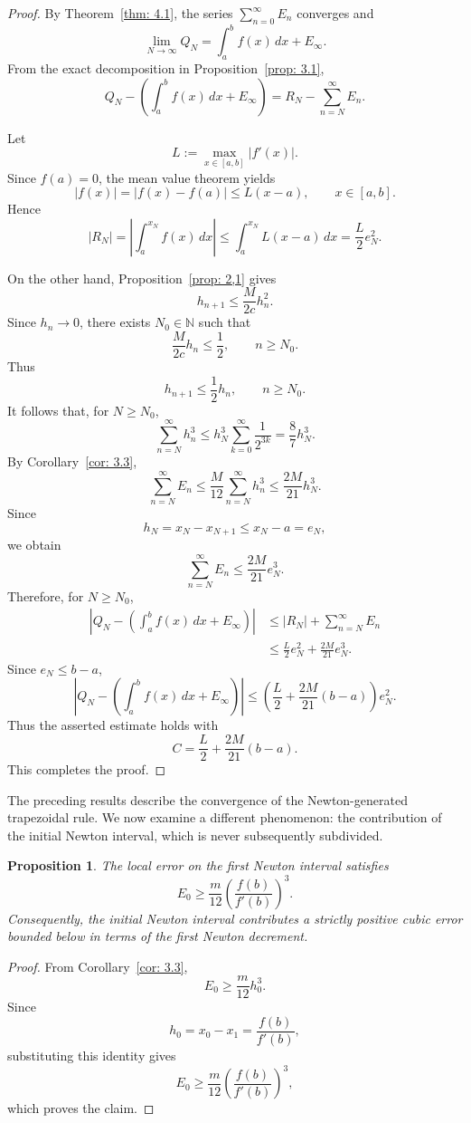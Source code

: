 \documentclass[psamsfonts,reqno]{amsart}
\theoremstyle{plain}
\newtheorem{proposition}[theorem]{Proposition}
\theoremstyle{definition}
\theoremstyle{remark}
\numberwithin{equation}{section}
\begin{document}
\begin{proof}
By Theorem~\ref{thm: 4.1},
the series $\sum_{n=0}^{\infty}E_n$ converges and
\[
\lim_{N\to\infty}Q_N
=
\int_a^b f(x)\,dx+E_\infty.
\]
From the exact decomposition in Proposition~\ref{prop: 3.1},
\[
Q_N-
\left(
\int_a^b f(x)\,dx+E_\infty
\right)
=
R_N-\sum_{n=N}^{\infty}E_n.
\]

Let
\[
L:=\max_{x\in[a,b]}|f'(x)|.
\]
Since $f(a)=0$, the mean value theorem yields
\[
|f(x)|
=
|f(x)-f(a)|
\leq L(x-a),
\qquad x\in[a,b].
\]
Hence
\[
|R_N|
=
\left|\int_a^{x_N}f(x)\,dx\right|
\leq
\int_a^{x_N}L(x-a)\,dx
=
\frac{L}{2}e_N^2.
\]

On the other hand, Proposition~\ref{prop: 2,1} gives
\[
h_{n+1}\leq \frac{M}{2c}h_n^2.
\]
Since $h_n\to0$, there exists $N_0\in\mathbb{N}$ such that
\[
\frac{M}{2c}h_n\leq\frac12,
\qquad n\geq N_0.
\]
Thus
\[
h_{n+1}\leq\frac12h_n,
\qquad n\geq N_0.
\]
It follows that, for $N\geq N_0$,
\[
\sum_{n=N}^{\infty}h_n^3
\leq
h_N^3\sum_{k=0}^{\infty}\frac{1}{2^{3k}}
=
\frac{8}{7}h_N^3.
\]
By Corollary~\ref{cor: 3.3},
\[
\sum_{n=N}^{\infty}E_n
\leq
\frac{M}{12}\sum_{n=N}^{\infty}h_n^3
\leq
\frac{2M}{21}h_N^3.
\]
Since
\[
h_N=x_N-x_{N+1}\leq x_N-a=e_N,
\]
we obtain
\[
\sum_{n=N}^{\infty}E_n
\leq
\frac{2M}{21}e_N^3.
\]
Therefore, for $N\geq N_0$,
\[
\begin{aligned}
\left|
Q_N-
\left(
\int_a^b f(x)\,dx+E_\infty
\right)
\right|
&\leq
|R_N|+\sum_{n=N}^{\infty}E_n\\
&\leq
\frac{L}{2}e_N^2
+
\frac{2M}{21}e_N^3.
\end{aligned}
\]
Since $e_N\leq b-a$,
\[
\left|
Q_N-
\left(
\int_a^b f(x)\,dx+E_\infty
\right)
\right|
\leq
\left(
\frac{L}{2}
+
\frac{2M}{21}(b-a)
\right)e_N^2.
\]
Thus the asserted estimate holds with
\[
C=
\frac{L}{2}
+
\frac{2M}{21}(b-a).
\]
This completes the proof.
\end{proof}
The preceding results describe the convergence of the Newton-generated
trapezoidal rule. We now examine a different phenomenon: the contribution of
the initial Newton interval, which is never subsequently subdivided.

\begin{proposition}
The local error on the first Newton interval satisfies
\[
E_0
\ge
\frac{m}{12}
\left(\frac{f(b)}{f'(b)}\right)^3.
\]
Consequently, the initial Newton interval contributes a strictly positive cubic error bounded below in terms of the first Newton decrement.
\end{proposition}

\begin{proof}
From Corollary~\ref{cor: 3.3},
\[
E_0\ge\frac{m}{12}h_0^3.
\]
Since
\[
h_0=x_0-x_1=\frac{f(b)}{f'(b)},
\]
substituting this identity gives
\[
E_0
\ge
\frac{m}{12}
\left(\frac{f(b)}{f'(b)}\right)^3,
\]
which proves the claim.
\end{proof}
\end{document}
